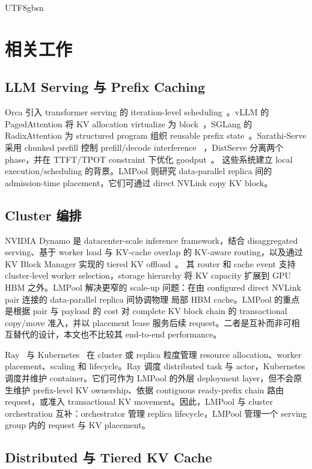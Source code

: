 \documentclass[11pt,a4paper]{article}
\newcommand{\sys}{LMPool}
\begin{document}
\begin{CJK*}{UTF8}{gbsn}
\section{相关工作}

\subsection{LLM Serving 与 Prefix Caching}

Orca 引入 transformer serving 的 iteration-level scheduling~\citep{ORCA}。vLLM 的 PagedAttention 将
KV allocation virtualize 为 block~\citep{vLLM}，SGLang 的 RadixAttention 为 structured program 组织
reusable prefix state~\citep{SGLang}。Sarathi-Serve 采用 chunked prefill 控制 prefill/decode interference
~\citep{SarathiServe}，DistServe 分离两个 phase，并在 TTFT/TPOT constraint 下优化 goodput~\citep{DistServe}。
这些系统建立 local execution/scheduling 的背景。\sys{} 则研究 data-parallel replica 间的 admission-time
placement，它们可通过 direct NVLink copy KV block。

\subsection{Cluster 编排}

NVIDIA Dynamo 是 datacenter-scale inference framework，结合 disaggregated serving、基于 worker load 与
KV-cache overlap 的 KV-aware routing，以及通过 KV Block Manager 实现的 tiered KV offload~\citep{NVIDIADynamo}。
其 router 和 cache event 支持 cluster-level worker selection，storage hierarchy 将 KV capacity 扩展到 GPU HBM
之外。\sys{} 解决更窄的 scale-up 问题：在由 configured direct NVLink pair 连接的 data-parallel replica 间协调物理
局部 HBM cache。\sys{} 的重点是根据 pair 与 payload 的 cost 对 complete KV block chain 的 transactional copy/move
准入，并以 placement lease 服务后续 request。二者是互补而非可相互替代的设计，本文也不比较其 end-to-end performance。

Ray~\citep{Ray} 与 Kubernetes~\citep{Kubernetes} 在 cluster 或 replica 粒度管理 resource allocation、worker
placement、scaling 和 lifecycle。Ray 调度 distributed task 与 actor，Kubernetes 调度并维护 container。它们可作为
\sys{} 的外层 deployment layer，但不会原生维护 prefix-level KV ownership、依据 contiguous ready-prefix chain
路由 request，或准入 transactional KV movement。因此，\sys{} 与 cluster orchestration 互补：orchestrator 管理
replica lifecycle，\sys{} 管理一个 serving group 内的 request 与 KV placement。

\subsection{Distributed 与 Tiered KV Cache}


\end{CJK*}
\end{document}
